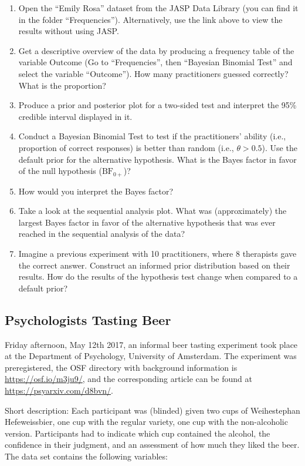\documentclass[
]{book}
\providecommand{\tightlist}{%
  \setlength{\itemsep}{0pt}\setlength{\parskip}{0pt}}
\begin{document}
\begin{enumerate}
\def\labelenumi{\arabic{enumi}.}
\tightlist
\item
  Open the ``Emily Rosa'' dataset from the JASP Data Library (you can find it in the folder ``Frequencies''). Alternatively, use the link above to view the results without using JASP.
\item
  Get a descriptive overview of the data by producing a frequency table of the variable Outcome (Go to ``Frequencies'', then ``Bayesian Binomial Test'' and select the variable ``Outcome''). How many practitioners guessed correctly? What is the proportion?
\item
  Produce a prior and posterior plot for a two-sided test and interpret the 95\% credible interval displayed in it.
\item
  Conduct a Bayesian Binomial Test to test if the practitioners' ability (i.e., proportion of correct responses) is better than random (i.e., \(\theta > 0.5\)). Use the default prior for the alternative hypothesis. What is the Bayes factor in favor of the null hypothesis (\(\text{BF}_{0+}\))?
\item
  How would you interpret the Bayes factor?
\item
  Take a look at the sequential analysis plot. What was (approximately) the largest Bayes factor in favor of the alternative hypothesis that was ever reached in the sequential analysis of the data?
\item
  Imagine a previous experiment with 10 practitioners, where 8 therapists gave the correct answer. Construct an informed prior distribution based on their results. How do the results of the hypothesis test change when compared to a default prior?
\end{enumerate}

\hypertarget{psychologists-tasting-beer}{%
\subsection{Psychologists Tasting Beer}\label{psychologists-tasting-beer}}

Friday afternoon, May 12th 2017, an informal beer tasting experiment took place at the Department of Psychology, University of Amsterdam. The experiment was preregistered, the OSF directory with background information is \url{https://osf.io/m3ju9/}, and the corresponding article can be found at \url{https://psyarxiv.com/d8bvn/}.

Short description: Each participant was (blinded) given two cups of Weihestephan Hefeweissbier, one cup with the regular variety, one cup with the non-alcoholic version. Participants had to indicate which cup contained the alcohol, the confidence in their judgment, and an assessment of how much they liked the beer. The data set contains the following variables:
\end{document}
